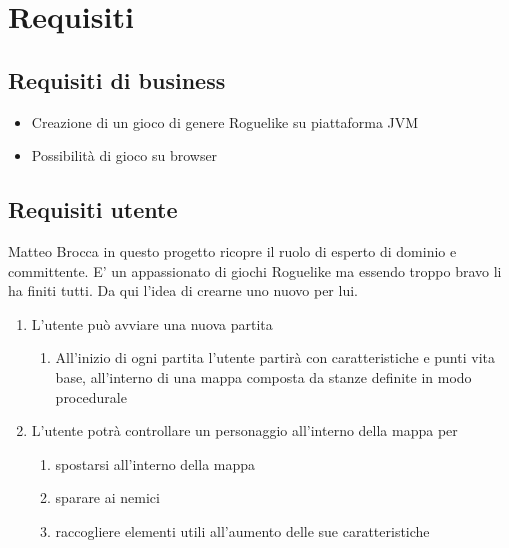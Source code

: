 \section{Requisiti}

\subsection{Requisiti di business}
\begin{itemize}
    \item Creazione di un gioco di genere Roguelike su piattaforma JVM
    \item Possibilità di gioco su browser
\end{itemize}

\subsection{Requisiti utente}

Matteo Brocca in questo progetto ricopre il ruolo di esperto di dominio e committente. 
E' un appassionato di giochi Roguelike ma essendo troppo bravo li ha finiti tutti. 
Da qui l'idea di crearne uno nuovo per lui. 

\begin{enumerate}
    \item L'utente può avviare una nuova partita
    \begin{enumerate}
        \item All'inizio di ogni partita l'utente partirà con caratteristiche e punti vita base,
        all'interno di una mappa composta da stanze definite in modo procedurale
    \end{enumerate}
    \item L'utente potrà controllare un personaggio all'interno della mappa per
    \begin{enumerate}
        \item spostarsi all'interno della mappa
        \item sparare ai nemici
        \item raccogliere elementi utili all'aumento delle sue caratteristiche
    \end{enumerate}
\end{enumerate}

